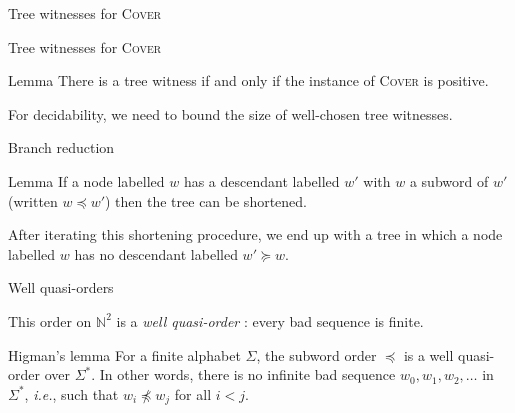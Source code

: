 \documentclass{beamer}
\newcommand{\COVER}{\textsc{Cover}\xspace}
\begin{document}
\begin{frame}{Tree witnesses for \COVER}
	
	\centering
	
	
\end{frame}

\begin{frame}{Tree witnesses for \COVER}
	\begin{center}
	\resizebox{!}{4.5cm}{
	
	}
	\end{center}
\pause

\begin{block}{Lemma}
There is a tree witness if and only if the instance of \COVER is positive.  
\end{block}
For decidability, we need to bound the size of well-chosen tree witnesses.
\end{frame}

\begin{frame}{Branch reduction}
	
	\begin{block}{Lemma}
		If a node labelled $w$ has a descendant labelled $w'$ with $w$ a subword of $w'$ (written $w \preceq w'$) then the tree can be shortened.
	\end{block}
	\begin{center}
	
	\end{center}
	\pause \pause \pause
	\vspace{-1cm}
	
	After iterating this shortening procedure, we end up with a tree in which a node labelled $w$ has no descendant labelled $w' \succeq w$. 
\end{frame}


\begin{frame}{Well quasi-orders}
		 
		
		
		
		
		This order on $\mathbb{N}^2$ is a \emph{well quasi-order} : every bad sequence is finite.

			\begin{block}{Higman's lemma}
		For a finite alphabet $\Sigma$, the subword order $\preceq$ is a well quasi-order over $\Sigma^*$. In other words, there is no infinite bad sequence $w_0, w_1, w_2, \ldots$ in $\Sigma^*$, \emph{i.e.}, such that $w_i \npreceq w_j$ for all $i<j$.
	\end{block}
\end{frame}
\end{document}
